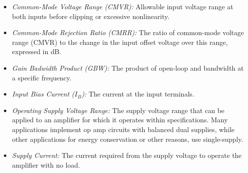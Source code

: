 		\begin{itemize}
			\item\textit{\textit{Common-Mode Voltage Range (CMVR):}} Allowable input voltage range at both inputs before clipping or excessive nonlinearity.\label{itm:opamp-cmrr}
			\item\textit{\textit{Common-Mode Rejection Ratio (CMRR):}} The ratio of common-mode voltage range (CMVR) to the change in the input offset voltage over this range, expressed in dB.\label{itm:opamp-cmrr}
			\item\textit{\textit{Gain Badwidth Product (GBW):}} The product of open-loop and bandwidth at a specific frequency.\label{itm:opamp-gbw}
			\item\textit{\textit{Input Bias Current ($I_{B}$):}} The current at the input terminals.\label{itm:opamp-input-bias-current}
			\item\textit{\textit{Operating Supply Voltage Range:}} The supply voltage range that can be applied to an amplifier for which it operates within specifications. Many applications implement op amp circuits with balanced dual supplies, while other applications for energy conservation or other reasons, use single-supply.\label{itm:opamp-operating-supply-voltage-range}
			\item\textit{\textit{Supply Current:}} The current required from the supply voltage to operate the amplifier with no load.\label{itm:opamp-supply-current}
		\end{itemize}